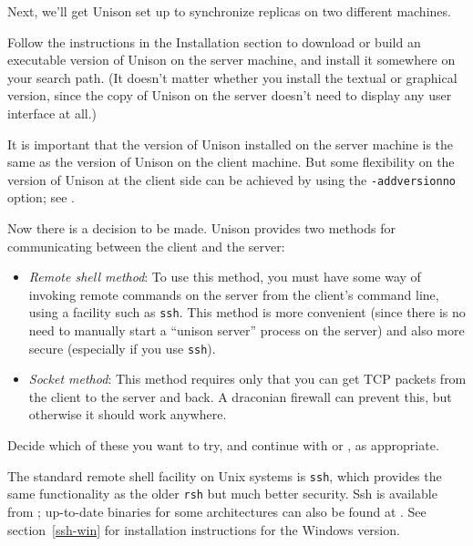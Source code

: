\documentclass{article}
\begin{document}

Next, we'll get Unison set up to synchronize replicas on two different
machines.

Follow the instructions in the Installation section to download or
build an executable version of Unison on the server machine, and
install it somewhere on your search path.  (It doesn't matter whether
you install the textual or graphical version, since the copy of Unison on
the server doesn't need to display any user interface at all.)  

It is important that the version of Unison installed on the server
machine is the same as the version of Unison on the client machine.
But some flexibility on the version of Unison at the client side can
be achieved by using the \verb|-addversionno| option; see 
.

Now there is a decision to be made.  Unison provides two methods for
communicating between the client and the server:
\begin{itemize}
\item {\em Remote shell method}: To use this method, you must have
  some way of invoking remote commands on the server from the client's
  command line, using a facility such as \verb|ssh|.
  This method is more convenient (since there is no need to manually
  start a ``unison server'' process on the server) and also more
  secure (especially if you use \verb|ssh|).

\item {\em Socket method}: This method requires only that you can get
  TCP packets from the client to the server and back.  A draconian 
  firewall can prevent this, but otherwise it should work anywhere.
\end{itemize}

Decide which of these you want to try, and continue with
 or
, as appropriate.



The standard remote shell facility on Unix systems is \verb|ssh|, which provides the
same functionality as the older \verb|rsh| but much better security.  Ssh is available from
; up-to-date binaries for some
architectures can also be found at
.  See section~\ref{ssh-win}
for installation instructions for the Windows version.
\end{document}
